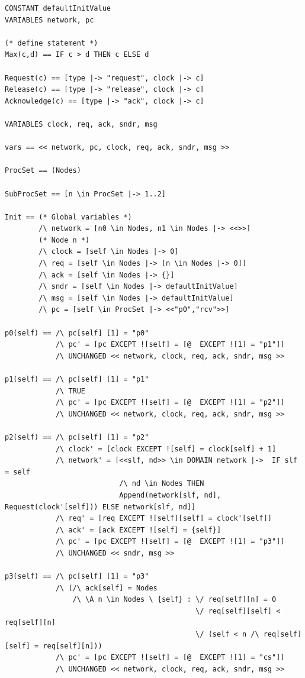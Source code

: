 \documentclass{thesul}
\begin{document}
\begin{appendices}
\begin{lstlisting}[caption = TLA+ translation for Sub-Processes, frame = tlrb, firstnumber = 1]
CONSTANT defaultInitValue
VARIABLES network, pc

(* define statement *)
Max(c,d) == IF c > d THEN c ELSE d

Request(c) == [type |-> "request", clock |-> c]
Release(c) == [type |-> "release", clock |-> c]
Acknowledge(c) == [type |-> "ack", clock |-> c]

VARIABLES clock, req, ack, sndr, msg

vars == << network, pc, clock, req, ack, sndr, msg >>

ProcSet == (Nodes)

SubProcSet == [n \in ProcSet |-> 1..2]

Init == (* Global variables *)
        /\ network = [n0 \in Nodes, n1 \in Nodes |-> <<>>]
        (* Node n *)
        /\ clock = [self \in Nodes |-> 0]
        /\ req = [self \in Nodes |-> [n \in Nodes |-> 0]]
        /\ ack = [self \in Nodes |-> {}]
        /\ sndr = [self \in Nodes |-> defaultInitValue]
        /\ msg = [self \in Nodes |-> defaultInitValue]
        /\ pc = [self \in ProcSet |-> <<"p0","rcv">>]

p0(self) == /\ pc[self] [1] = "p0"
            /\ pc' = [pc EXCEPT ![self] = [@  EXCEPT ![1] = "p1"]]
            /\ UNCHANGED << network, clock, req, ack, sndr, msg >>

p1(self) == /\ pc[self] [1] = "p1"
            /\ TRUE
            /\ pc' = [pc EXCEPT ![self] = [@  EXCEPT ![1] = "p2"]]
            /\ UNCHANGED << network, clock, req, ack, sndr, msg >>

p2(self) == /\ pc[self] [1] = "p2"
            /\ clock' = [clock EXCEPT ![self] = clock[self] + 1]
            /\ network' = [<<slf, nd>> \in DOMAIN network |->  IF slf = self 
                           /\ nd \in Nodes THEN 
                           Append(network[slf, nd], Request(clock'[self])) ELSE network[slf, nd]]
            /\ req' = [req EXCEPT ![self][self] = clock'[self]]
            /\ ack' = [ack EXCEPT ![self] = {self}]
            /\ pc' = [pc EXCEPT ![self] = [@  EXCEPT ![1] = "p3"]]
            /\ UNCHANGED << sndr, msg >>

p3(self) == /\ pc[self] [1] = "p3"
            /\ (/\ ack[self] = Nodes
                /\ \A n \in Nodes \ {self} : \/ req[self][n] = 0
                                             \/ req[self][self] < req[self][n]
                                             \/ (self < n /\ req[self][self] = req[self][n]))
            /\ pc' = [pc EXCEPT ![self] = [@  EXCEPT ![1] = "cs"]]
            /\ UNCHANGED << network, clock, req, ack, sndr, msg >>


\end{lstlisting}
\end{appendices}
\end{document}
